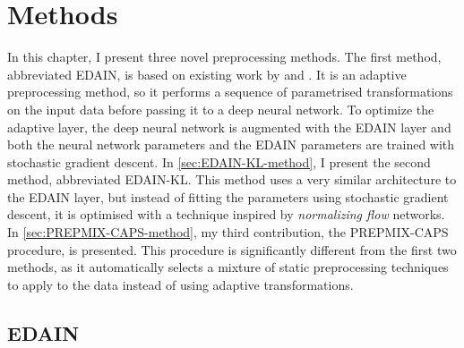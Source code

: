 \documentclass{statsmsc}
\begin{document}
{%





\chapter{Methods} %

In this chapter, I present three novel preprocessing methods. The first method, abbreviated
\acs{EDAIN}, is based on existing work by \citeauthor{dain} and \citeauthor{bin}. It
is an adaptive preprocessing method, so it performs a sequence of parametrised transformations
on the input data before passing it to a deep neural network. To optimize the adaptive layer,
the deep
neural network is augmented with the \acs{EDAIN} layer and both the neural network parameters
and the \acs{EDAIN} parameters are trained with stochastic gradient descent.
In \cref{sec:EDAIN-KL-method}, I present the second method, abbreviated \acs{EDAIN-KL}.
This method uses a very similar architecture to the \acs{EDAIN} layer, but instead of fitting the
parameters using stochastic gradient descent, it is optimised with a technique inspired by
\textit{normalizing flow} networks. In \cref{sec:PREPMIX-CAPS-method}, my third
contribution, the \acs{PREPMIX-CAPS} procedure, is presented. This procedure is significantly
different from the first two methods, as it automatically selects a mixture of static preprocessing
techniques to apply to the data instead of using adaptive transformations.


\section{EDAIN}%
\label{sec:EDAIN-method}



}
\end{document}
